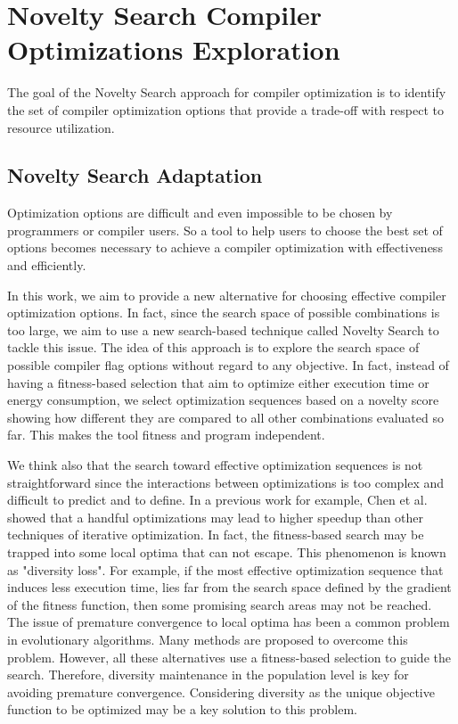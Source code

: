 \section{Novelty Search Compiler Optimizations Exploration}
 
The goal of the Novelty Search approach for compiler optimization is to identify the set of compiler optimization options that provide a trade-off with respect to resource utilization. 

\subsection{Novelty Search Adaptation}
Optimization options are difficult and even impossible to be chosen by programmers or compiler users. So a tool to help users to choose the best set of options becomes necessary to achieve a compiler optimization with effectiveness and efficiently. 

In this work, we aim to provide a new alternative for choosing effective compiler optimization options. In fact, since the search space of possible combinations is too large, we aim to use a new search-based technique called Novelty Search to tackle this issue. The idea of this approach is to explore the search space of possible compiler flag options without regard to any objective. In fact, instead of having a fitness-based selection that aim to optimize either execution time or energy consumption, we select optimization sequences based on a novelty score showing how different they are compared to all other combinations evaluated so far. This makes the tool fitness and program independent.

We think also that the search toward effective optimization sequences is not straightforward since the interactions between optimizations is too complex and difficult to predict and to define. In a previous work for example, Chen et al. \cite{chen2012deconstructing}showed that a handful optimizations may lead to higher speedup than other techniques of iterative optimization. In fact, the fitness-based search may be trapped into some local optima that can not escape. This phenomenon is known as "diversity loss". For example, if the most effective optimization sequence that induces less execution time, lies far from the search space defined by the gradient of the fitness function, then some promising search areas may not be reached. The issue of premature convergence to local optima has been a common problem in evolutionary algorithms. Many methods are proposed to overcome this
problem\cite{banzhaf1996effect,gathercole1996adverse}. However, all these alternatives use a fitness-based selection to guide the search. 
Therefore, diversity maintenance in the population level is key for avoiding premature convergence. Considering diversity as the unique objective function to be optimized may be a key solution to this problem.

